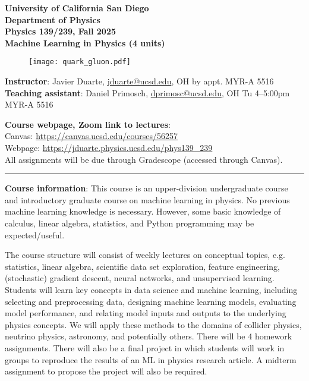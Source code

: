 \documentclass[12pt]{article}
\begin{document}
\begin{center}
	\textbf{University of California San Diego\\
		Department of Physics\\
		Physics 139/239, Fall 2025\\
		Machine Learning in Physics (4 units)}
\end{center}

\begin{figure}[h!]
	\centering
	\texttt{[image: quark\_gluon.pdf]}
\end{figure}

\noindent\textbf{Instructor}: Javier Duarte, \href{mailto:jduarte@ucsd.edu}{jduarte@ucsd.edu}, OH by appt. MYR-A 5516 \\
\noindent \textbf{Teaching assistant}: Daniel Primosch, \href{mailto:dprimosc@ucsd.edu}{dprimosc@ucsd.edu}, OH Tu 4--5:00pm MYR-A 5516

\noindent\textbf{Course webpage, Zoom link to lectures}:\\
\hspace*{1cm}Canvas: \href{https://canvas.ucsd.edu/courses/56257}{https://canvas.ucsd.edu/courses/56257}\\
\hspace*{1cm}Webpage: \href{https://jduarte.physics.ucsd.edu/phys139\_239}{https://jduarte.physics.ucsd.edu/phys139\_239}\\
\hspace*{1cm}All assignments will be due through Gradescope (accessed through Canvas).

\begin{center}
	\rule{\textwidth}{0.5pt}
\end{center}

\noindent\textbf{Course information}: This course is an upper-division undergraduate course and introductory graduate course on machine learning in physics.
No previous machine learning knowledge is necessary.
However, some basic knowledge of calculus, linear algebra, statistics, and Python programming may be expected/useful.

The course structure will consist of weekly lectures on conceptual topics, e.g. statistics, linear algebra, scientific data set exploration, feature engineering, (stochastic) gradient descent, neural networks, and unsupervised learning.
Students will learn key concepts in data science and machine learning, including selecting and preprocessing data, designing machine learning models, evaluating model performance, and relating model inputs and outputs to the underlying physics concepts.
We will apply these methods to the domains of collider physics, neutrino physics, astronomy, and potentially others.
There will be 4 homework assignments.
There will also be a final project in which students will work in groups to reproduce the results of an ML in physics research article.
A midterm assignment to propose the project will also be required.
\end{document}
